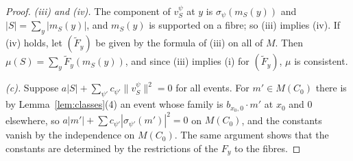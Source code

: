 \begin{proof}
\emph{(iii) and (iv).} The component of $v^\psi_S$ at $y$ is $\sigma_\psi(m_S(y))$ and $|S|=\sum_y|m_S(y)|$, and $m_S(y)$ is supported on a fibre; so (iii) implies (iv). If (iv) holds, let $(\tilde F_y)$ be given by the formula of (iii) on all of $M$. Then $\mu(S)=\sum_y\tilde F_y(m_S(y))$, and since (iii) implies (i) for $(\tilde F_y)$, $\mu$ is consistent.

\emph{(c).} Suppose $a|S|+\sum_{\psi'}c_{\psi'}\lVert v^\psi_S\rVert^2=0$ for all events. For $m'\in M(C_0)$ there is by Lemma~\ref{lem:classes}(4) an event whose family is $b_{x_0,0}\cdot m'$ at $x_0$ and $0$ elsewhere, so $a|m'|+\sum c_{\psi'}|\sigma_{\psi'}(m')|^2=0$ on $M(C_0)$, and the constants vanish by the independence on $M(C_0)$. The same argument shows that the constants are determined by the restrictions of the $F_y$ to the fibres.
\end{proof}

